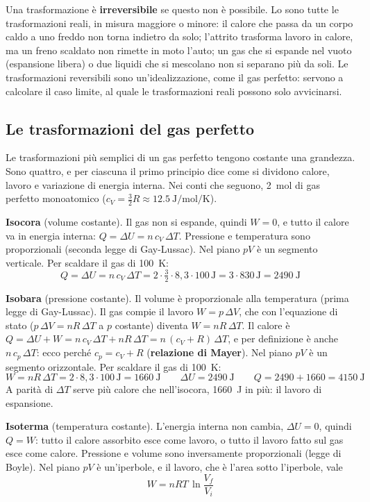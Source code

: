 Una trasformazione è \textbf{irreversibile} se questo non è possibile. Lo sono tutte le trasformazioni reali, in misura maggiore o minore: il calore che passa da un corpo caldo a uno freddo non torna indietro da solo; l'attrito trasforma lavoro in calore, ma un freno scaldato non rimette in moto l'auto; un gas che si espande nel vuoto (espansione libera) o due liquidi che si mescolano non si separano più da soli.
Le trasformazioni reversibili sono un'idealizzazione, come il gas perfetto: servono a calcolare il caso limite, al quale le trasformazioni reali possono solo avvicinarsi.

\subsection{Le trasformazioni del gas perfetto}

Le trasformazioni più semplici di un gas perfetto tengono costante una grandezza. Sono quattro, e per ciascuna il primo principio dice come si dividono calore, lavoro e variazione di energia interna. Nei conti che seguono, \SI{2}{\mole} di gas perfetto monoatomico ($c_V = \frac32 R \approx \SI{12,5}{\joule\per\mole\per\kelvin}$).

\textbf{Isocora} (volume costante). Il gas non si espande, quindi $W = 0$, e tutto il calore va in energia interna: $Q = \Delta U = n\,c_V\,\Delta T$. Pressione e temperatura sono proporzionali (seconda legge di Gay-Lussac). Nel piano $pV$ è un segmento verticale. Per scaldare il gas di \SI{100}{\kelvin}:
\[
  Q = \Delta U = n\,c_V\,\Delta T = 2 \cdot \tfrac32 \cdot 8{,}3 \cdot 100\,\si{\joule} = 3 \cdot 830\,\si{\joule} = \SI{2490}{\joule}
\]

\textbf{Isobara} (pressione costante). Il volume è proporzionale alla temperatura (prima legge di Gay-Lussac). Il gas compie il lavoro $W = p\,\Delta V$, che con l'equazione di stato ($p\,\Delta V = nR\,\Delta T$ a $p$ costante) diventa $W = nR\,\Delta T$. Il calore è $Q = \Delta U + W = n\,c_V\,\Delta T + nR\,\Delta T = n\,(c_V + R)\,\Delta T$, e per definizione è anche $n\,c_p\,\Delta T$: ecco perché $c_p = c_V + R$ (\textbf{relazione di Mayer}). Nel piano $pV$ è un segmento orizzontale. Per scaldare il gas di \SI{100}{\kelvin}:
\[
  W = nR\,\Delta T = 2 \cdot 8{,}3 \cdot 100\,\si{\joule} = \SI{1660}{\joule}
  \qquad
  \Delta U = \SI{2490}{\joule}
  \qquad
  Q = 2490 + 1660 = \SI{4150}{\joule}
\]
A parità di $\Delta T$ serve più calore che nell'isocora, \SI{1660}{\joule} in più: il lavoro di espansione.

\textbf{Isoterma} (temperatura costante). L'energia interna non cambia, $\Delta U = 0$, quindi $Q = W$: tutto il calore assorbito esce come lavoro, o tutto il lavoro fatto sul gas esce come calore. Pressione e volume sono inversamente proporzionali (legge di Boyle). Nel piano $pV$ è un'iperbole, e il lavoro, che è l'area sotto l'iperbole, vale
\[
  W = nRT\,\ln\frac{V_f}{V_i}
\]

